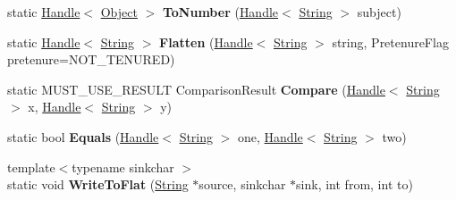 \begin{DoxyCompactItemize}
\item 
static \hyperlink{classv8_1_1internal_1_1_handle}{Handle}$<$ \hyperlink{classv8_1_1internal_1_1_object}{Object} $>$ {\bfseries To\+Number} (\hyperlink{classv8_1_1internal_1_1_handle}{Handle}$<$ \hyperlink{classv8_1_1internal_1_1_string}{String} $>$ subject)\hypertarget{classv8_1_1internal_1_1_string_a69e13cf50598fa9625df8a8dda4c4a2f}{}\label{classv8_1_1internal_1_1_string_a69e13cf50598fa9625df8a8dda4c4a2f}

\item 
static \hyperlink{classv8_1_1internal_1_1_handle}{Handle}$<$ \hyperlink{classv8_1_1internal_1_1_string}{String} $>$ {\bfseries Flatten} (\hyperlink{classv8_1_1internal_1_1_handle}{Handle}$<$ \hyperlink{classv8_1_1internal_1_1_string}{String} $>$ string, Pretenure\+Flag pretenure=N\+O\+T\+\_\+\+T\+E\+N\+U\+R\+ED)\hypertarget{classv8_1_1internal_1_1_string_abaa5a56b1b930ba3b50a98f33c953f3f}{}\label{classv8_1_1internal_1_1_string_abaa5a56b1b930ba3b50a98f33c953f3f}

\item 
static M\+U\+S\+T\+\_\+\+U\+S\+E\+\_\+\+R\+E\+S\+U\+LT Comparison\+Result {\bfseries Compare} (\hyperlink{classv8_1_1internal_1_1_handle}{Handle}$<$ \hyperlink{classv8_1_1internal_1_1_string}{String} $>$ x, \hyperlink{classv8_1_1internal_1_1_handle}{Handle}$<$ \hyperlink{classv8_1_1internal_1_1_string}{String} $>$ y)\hypertarget{classv8_1_1internal_1_1_string_a9eb13230c123d90d62a5ba90c473555d}{}\label{classv8_1_1internal_1_1_string_a9eb13230c123d90d62a5ba90c473555d}

\item 
static bool {\bfseries Equals} (\hyperlink{classv8_1_1internal_1_1_handle}{Handle}$<$ \hyperlink{classv8_1_1internal_1_1_string}{String} $>$ one, \hyperlink{classv8_1_1internal_1_1_handle}{Handle}$<$ \hyperlink{classv8_1_1internal_1_1_string}{String} $>$ two)\hypertarget{classv8_1_1internal_1_1_string_a8982711c2ae6275d16fa21386410f066}{}\label{classv8_1_1internal_1_1_string_a8982711c2ae6275d16fa21386410f066}

\item 
{\footnotesize template$<$typename sinkchar $>$ }\\static void {\bfseries Write\+To\+Flat} (\hyperlink{classv8_1_1internal_1_1_string}{String} $\ast$source, sinkchar $\ast$sink, int from, int to)\hypertarget{classv8_1_1internal_1_1_string_a089b286065c47f7ec627ce18710f3f44}{}\label{classv8_1_1internal_1_1_string_a089b286065c47f7ec627ce18710f3f44}


\end{DoxyCompactItemize}
